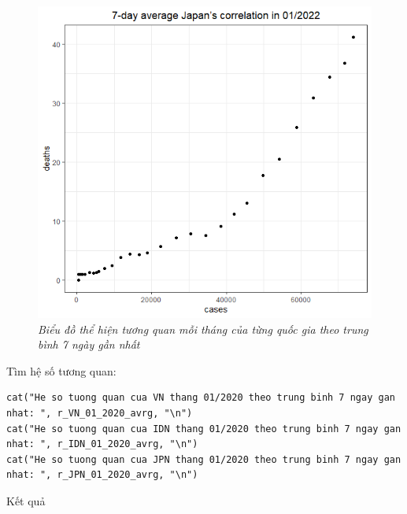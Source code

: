 \documentclass[a4paper]{article}
\theoremstyle{definition}
\begin{document}
\begin{enumerate}[1)]
\begin{figure}[H]
\begin{center}
        \includegraphics[scale = 0.3]{ix/ix.3/JPN_01_2022.png}
    \end{center}
        \vspace{+3mm}\caption{\it Biểu đồ thể hiện tương quan mỗi tháng của từng quốc gia theo trung bình 7 ngày gần nhất}
    \end{figure}

Tìm hệ số tương quan:
\begin{lstlisting}
cat("He so tuong quan cua VN thang 01/2020 theo trung binh 7 ngay gan nhat: ", r_VN_01_2020_avrg, "\n")
cat("He so tuong quan cua IDN thang 01/2020 theo trung binh 7 ngay gan nhat: ", r_IDN_01_2020_avrg, "\n")
cat("He so tuong quan cua JPN thang 01/2020 theo trung binh 7 ngay gan nhat: ", r_JPN_01_2020_avrg, "\n")
\end{lstlisting}

Kết quả


\end{enumerate}
\end{document}
